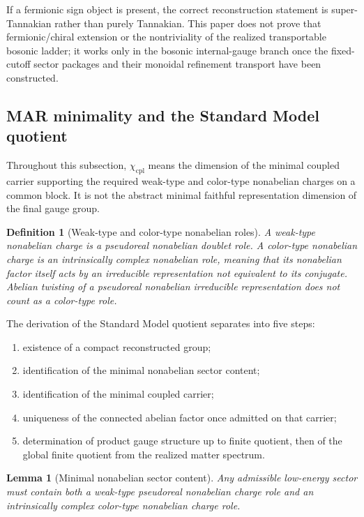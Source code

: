 \documentclass[11pt]{article}
\newtheorem{lemma}[theorem]{Lemma}
\newtheorem{definition}[theorem]{Definition}
\begin{document}
If a fermionic sign object is present, the correct reconstruction statement is super-Tannakian
rather than purely Tannakian. This paper does not prove that fermionic/chiral extension or the
nontriviality of the realized transportable bosonic ladder; it works only in the bosonic
internal-gauge branch once the fixed-cutoff sector packages and their monoidal refinement transport
have been constructed.

\subsection{MAR minimality and the Standard Model quotient}

Throughout this subsection, $\chi_{\mathrm{cpl}}$ means the dimension of the minimal coupled carrier supporting the required weak-type and color-type nonabelian charges on a common block. It is not the abstract minimal faithful representation dimension of the final gauge group.

\begin{definition}[Weak-type and color-type nonabelian roles]
A weak-type nonabelian charge is a pseudoreal nonabelian doublet role. A color-type nonabelian charge is an intrinsically complex nonabelian role, meaning that its nonabelian factor itself acts by an irreducible representation not equivalent to its conjugate. Abelian twisting of a pseudoreal nonabelian irreducible representation does not count as a color-type role.
\end{definition}

The derivation of the Standard Model quotient separates into five steps:
\begin{enumerate}[leftmargin=2em]
\item existence of a compact reconstructed group;
\item identification of the minimal nonabelian sector content;
\item identification of the minimal coupled carrier;
\item uniqueness of the connected abelian factor once admitted on that carrier;
\item determination of product gauge structure up to finite quotient, then of the global finite quotient from the realized matter spectrum.
\end{enumerate}

\begin{lemma}[Minimal nonabelian sector content]\label{lem:mincontent}
Any admissible low-energy sector must contain both a weak-type pseudoreal nonabelian charge role and an intrinsically complex color-type nonabelian charge role.
\end{lemma}
\end{document}
